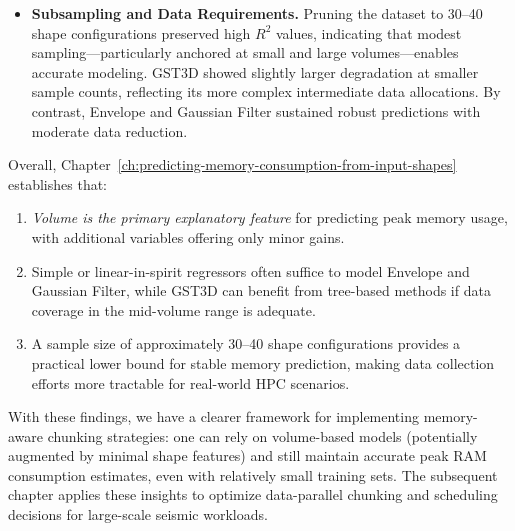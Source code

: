 \begin{itemize}
    \item \textbf{Subsampling and Data Requirements.}
    Pruning the dataset to 30–40 shape configurations preserved high $R^2$ values, indicating that modest sampling—particularly anchored at small and large volumes—enables accurate modeling.
    \ac{GST3D} showed slightly larger degradation at smaller sample counts, reflecting its more complex intermediate data allocations.
    By contrast, Envelope and Gaussian Filter sustained robust predictions with moderate data reduction.
\end{itemize}

Overall, Chapter~\ref{ch:predicting-memory-consumption-from-input-shapes} establishes that:
\begin{enumerate}
    \item \emph{Volume is the primary explanatory feature} for predicting peak memory usage, with additional variables offering only minor gains.
    \item Simple or linear-in-spirit regressors often suffice to model Envelope and Gaussian Filter, while \ac{GST3D} can benefit from tree-based methods if data coverage in the mid-volume range is adequate.
    \item A sample size of approximately 30–40 shape configurations provides a practical lower bound for stable memory prediction, making data collection efforts more tractable for real-world \ac{HPC} scenarios.
\end{enumerate}

With these findings, we have a clearer framework for implementing memory-aware chunking strategies: one can rely on volume-based models (potentially augmented by minimal shape features) and still maintain accurate peak \ac{RAM} consumption estimates, even with relatively small training sets.
The subsequent chapter applies these insights to optimize data-parallel chunking and scheduling decisions for large-scale seismic workloads.